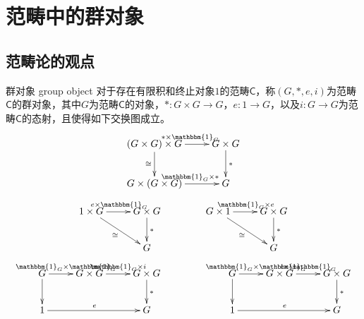 \section{范畴中的群对象}

\subsection{范畴论的观点}

\begin{definition}{群对象 group object}
	对于存在有限积和终止对象$1$的范畴$\mathsf{C}$，称$(G,*,e, i )$为范畴$\mathsf{C}$的群对象，其中$G$为范畴$\mathsf{C}$的对象，$*:G\times G\to G$，$e:1\to G$，以及$ i :G\to G$为范畴$\mathsf{C}$的态射，且使得如下交换图成立。
	$$
	\xymatrix{
		(G\times G)\times G \ar[r]^{*\times\mathbbm{1}_G} \ar[d]_{\cong} & G\times G \ar[d]^{*}\\
		G\times (G\times G) \ar[r]^{\mathbbm{1}_{G}\times *} & G
	}
	$$
	$$
	\xymatrix{
		1\times G \ar[r]^{e\times \mathbbm{1}_G} \ar[dr]_{\cong} & G\times G \ar[d]^{*}\\
		&G 
	}
	\qquad\qquad
	\xymatrix{
		G\times 1 \ar[r]^{\mathbbm{1}_G\times e} \ar[dr]_{\cong} & G\times G \ar[d]^{*}\\
		&G 
	}
	$$
	$$
	\xymatrix{
		G \ar[r]^{\mathbbm{1}_G\times\mathbbm{1}_G} \ar[d] & G\times G \ar[r]^{\mathbbm{1}_G\times i } & G\times G \ar[d]^{*} \\
		1 \ar[rr]^{e} & & G
	}
	\qquad\qquad
	\xymatrix{
		G \ar[r]^{\mathbbm{1}_G\times\mathbbm{1}_G} \ar[d] & G\times G \ar[r]^{ i \times\mathbbm{1}_G} & G\times G \ar[d]^{*} \\
		1 \ar[rr]^{e} & & G
	}
	$$
\end{definition}

% 
